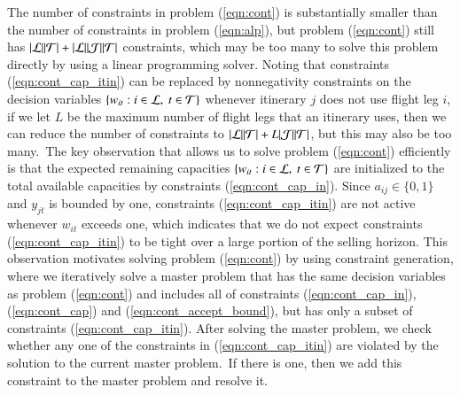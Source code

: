 The number of constraints in problem (\ref{eqn:cont}) is substantially smaller than the number of constraints in problem (\ref{eqn:alp}), but problem (\ref{eqn:cont}) still has $|{\cal L}||{\cal T}| +  |{\cal L}| |{\cal J}| |{\cal T}| $ constraints, which may be too many to solve this problem directly by using a linear programming solver. Noting that constraints (\ref{eqn:cont_cap_itin}) can be replaced by nonnegativity constraints on the decision variables $\{w_{it} : i \in {\cal L},~t \in {\cal T}\}$ whenever itinerary $j$ does not use flight leg $i$, if we let $L$ be the maximum number of flight legs that an itinerary uses, then we can reduce the number of constraints to $|{\cal L}| |{\cal T}| + L|{\cal J}||{\cal T}|$, but this may also be too many.~The key observation that allows us to solve problem (\ref{eqn:cont}) efficiently is that the expected remaining capacities $\{ w_{it} : i \in {\cal L},~ t \in {\cal T}\}$ are initialized to the total available capacities  by constraints (\ref{eqn:cont_cap_in}). Since $a_{ij} \in \{0,1\}$ and $ y_{jt}$ is bounded by one, constraints (\ref{eqn:cont_cap_itin}) are not active whenever $w_{it}$ exceeds one, which indicates that we do not expect constraints (\ref{eqn:cont_cap_itin}) to be tight over a large portion of the selling horizon. This observation motivates solving problem (\ref{eqn:cont}) by using constraint generation, where we iteratively solve a master problem that has the same decision variables as problem (\ref{eqn:cont}) and includes all of constraints (\ref{eqn:cont_cap_in}), (\ref{eqn:cont_cap}) and (\ref{eqn:cont_accept_bound}), but has only a subset of constraints (\ref{eqn:cont_cap_itin}). After solving the master problem, we check whether any one of the constraints in (\ref{eqn:cont_cap_itin}) are violated by the solution to the current master problem.~If there is one, then we add this constraint to the master problem and resolve it. 


